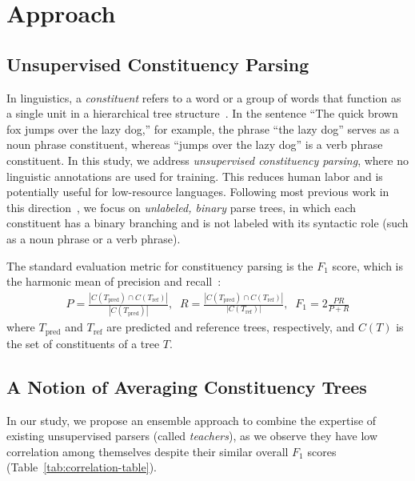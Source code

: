 \documentclass{article}
\begin{document}
\section{Approach}

\subsection{Unsupervised Constituency Parsing}
\label{subsection:unsupConstPars}

In linguistics, a \textit{constituent} refers to a word or a group of words that function as a single unit in a hierarchical tree structure~\citep{constituencyTree}. In the sentence ``The quick brown fox jumps over the lazy dog,'' for example, the phrase ``the lazy dog'' serves as a noun phrase constituent, whereas ``jumps over the lazy dog'' is a verb phrase constituent. In this study, we address \textit{unsupervised constituency parsing}, where no linguistic annotations are used for training. This reduces human labor and is potentially useful for low-resource languages. Following most previous work in this direction~\citep{cao-etal-2020-unsupervised,maveli-cohen-2022-co,li-lu-2023-contextual}, we focus on \textit{unlabeled, binary} parse trees, in which each constituent has a binary branching and is not labeled with its syntactic role (such as a noun phrase or a verb phrase).

The standard evaluation metric for constituency parsing is the $F_1$ score, which is the harmonic mean of precision and recall~\citep{shen2017neural,SupervisedCRFConstituencyParsing}:
\begin{align}P = \frac{|C(T_{\text{pred}}) \cap C(T_{\text{ref}})|}{|C(T_{\text{pred}})|},\;\; R = \frac{|C(T_{\text{pred}}) \cap C(T_{\text{ref}})|}{|C(T_{\text{ref}})|},\;\; F_1 = 2 \frac{PR}{P+R}
\end{align}
where $T_{\text{pred}}$ and $T_{\text{ref}}$ are predicted and reference trees, respectively, and $C(T)$ is the set of constituents of a tree $T$.

\subsection{A Notion of Averaging Constituency Trees} 

In our study, we propose an ensemble approach to combine the expertise of existing unsupervised parsers (called \textit{teachers}), as we observe they have low correlation among themselves despite their similar overall $F_1$ scores (Table~\ref{tab:correlation-table}).
\end{document}
